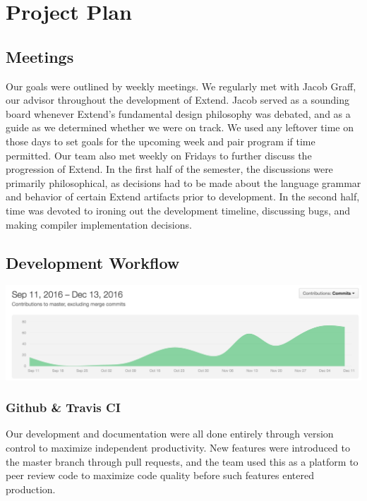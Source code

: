 \chapter{Project Plan}

\section{Meetings}
Our goals were outlined by weekly meetings. We regularly met with Jacob Graff, our advisor throughout the development of Extend.
Jacob served as a sounding board whenever Extend's fundamental design philosophy was debated, and as a guide as we determined whether we were on track. We used any leftover time on those days to set goals for the upcoming week and pair program if time permitted.
\newline \newline
Our team also met weekly on Fridays to further discuss the progression of Extend. In the first half of the semester, the discussions were primarily philosophical, as decisions had to be made about the language grammar and behavior of certain Extend artifacts prior to development. In the second half, time was devoted to ironing out the development timeline, discussing bugs, and making compiler implementation decisions.

\section{Development Workflow}
  \begin{center}
  \includegraphics[width=.9\textwidth]{img/extend_git_graph.png}
  \end{center}

  \subsection{Github \& Travis CI}
  Our development and documentation were all done entirely through version control to maximize independent productivity.
  New features were introduced to the master branch through pull requests, and the team used this as a platform to peer review code to maximize code quality before such features entered production.

